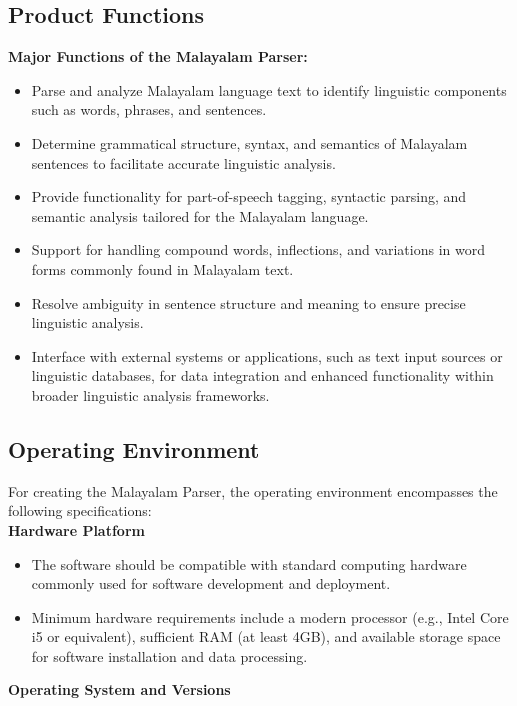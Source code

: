 \documentclass[12pt]{article}
\begin{document}
	\newpage
	\subsection{Product Functions}
	\textbf{Major Functions of the Malayalam Parser:}
	
	\begin{itemize}[label=-]
		\item Parse and analyze Malayalam language text to identify linguistic components such as
		words, phrases, and sentences.
		\item Determine grammatical structure, syntax, and semantics of Malayalam sentences to
		facilitate accurate linguistic analysis.
		\item Provide functionality for part-of-speech tagging, syntactic parsing, and semantic
		analysis tailored for the Malayalam language.
		\item Support for handling compound words, inflections, and variations in word forms
		commonly found in Malayalam text.
		\item Resolve ambiguity in sentence structure and meaning to ensure precise linguistic
		analysis.
		\item Interface with external systems or applications, such as text input sources or linguistic
		databases, for data integration and enhanced functionality within broader linguistic
		analysis frameworks.
	\end{itemize}

	\subsection{Operating Environment}
	For creating the Malayalam Parser, the operating environment encompasses the following
	specifications:\\
	\textbf{Hardware Platform}
	
	\begin{itemize}[label=-]
		\item The software should be compatible with standard computing hardware commonly
		used for software development and deployment.
		\item Minimum hardware requirements include a modern processor (e.g., Intel Core i5 or
		equivalent), sufficient RAM (at least 4GB), and available storage space for software
		installation and data processing.
	\end{itemize}

	\textbf{Operating System and Versions}
	
\end{document}
